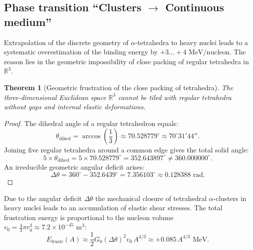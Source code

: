 \documentclass[11pt,a4paper]{article}
\newtheorem{theorem}{Theorem}
\theoremstyle{definition}
\theoremstyle{remark}
\begin{document}
\subsection{Phase transition ``Clusters $\to$ Continuous medium''}

Extrapolation of the discrete geometry of $\alpha$-tetrahedra to heavy nuclei leads to a systematic overestimation of the binding energy by $+3\dots +4\text{ MeV/nucleon}$. The reason lies in the geometric impossibility of close packing of regular tetrahedra in $\mathbb{R}^3$.

\begin{theorem}[Geometric frustration of the close packing of tetrahedra]
	\label{thm:tetrahedral_frustration}
	The three-dimensional Euclidean space $\mathbb{R}^3$ cannot be tiled with regular tetrahedra without gaps and internal elastic deformations.
\end{theorem}

\begin{proof}
	The dihedral angle of a regular tetrahedron equals:
\begin{equation}
\theta_{\mathrm{dihed}} = \arccos\left(\frac{1}{3}\right) \approx 70.528779^\circ \approx 70^\circ 31' 44''.
\end{equation}
Joining five regular tetrahedra around a common edge gives the total solid angle:
\begin{equation}
	5 \times \theta_{\mathrm{dihed}} = 5 \times 70.528779^\circ = 352.643897^\circ \ne 360.000000^\circ.
\label{eq:five_tetrahedra_sum}
\end{equation}
An irreducible geometric angular deficit arises:
\begin{equation}
	\Delta\theta = 360^\circ - 352.6439^\circ = 7.356103^\circ \approx 0.128388\text{ rad}.
\label{eq:angular_deficit_exact}
\end{equation}
\end{proof}

Due to the angular deficit $\Delta\theta$ the mechanical closure of tetrahedral $\alpha$-clusters in heavy nuclei leads to an accumulation of elastic shear stresses. The total frustration energy is proportional to the nucleon volume $v_0 = \frac{4}{3}\pi r_0^3 \approx 7.2 \times 10^{-45}\text{ m}^3$:
\begin{equation}
    E_{\mathrm{frustr}}(A) \approx \frac{1}{2} G_0 (\Delta\theta)^2 v_0 \, A^{4/3} \approx +0.085 \, A^{4/3}\text{ MeV}.
    \label{eq:frustration_energy_scaling}
\end{equation}
\end{document}
